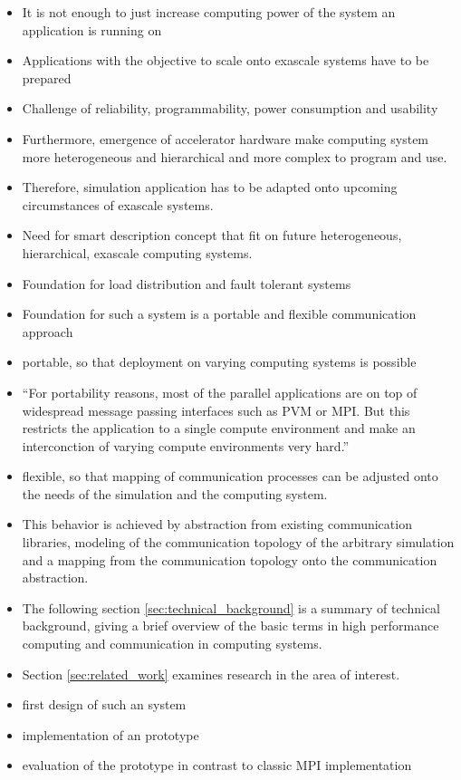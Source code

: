 \begin{itemize}
\item It is not enough to just increase computing power of the system
  an application is running on
\item Applications with the objective to scale onto exascale systems
  have to be prepared
\item Challenge of reliability, programmability, power consumption and
  usability
\item Furthermore, emergence of accelerator hardware make computing
  system more heterogeneous and hierarchical and more complex to
  program and use.
\item Therefore, simulation application has to be adapted onto
  upcoming circumstances of exascale systems.
\item Need for smart description concept that fit on future
  heterogeneous, hierarchical, exascale computing systems.
\item Foundation for load distribution and fault tolerant systems

\item Foundation for such a system is a portable and flexible
  communication approach
\item portable, so that deployment on varying computing systems is
  possible
\item ``For portability reasons, most of the parallel applications are on top
  of widespread message passing interfaces such as PVM or MPI. But
  this restricts the application to a single compute environment and
  make an interconction of varying compute environments very hard.''
\item flexible, so that mapping of communication processes can be
  adjusted onto the needs of the simulation and the computing system.
\item This behavior is achieved by abstraction from existing
  communication libraries, modeling of the communication topology of
  the arbitrary simulation and a mapping from the communication
  topology onto the communication abstraction.

\item The following section \ref{sec:technical_background} is a
  summary of technical background, giving a brief overview of the
  basic terms in high performance computing and communication in
  computing systems.
\item Section \ref{sec:related_work} examines research in the
  area of interest.
\item first design of such an system
\item implementation of an prototype
\item evaluation of the prototype in contrast to classic MPI implementation

\end{itemize}


\cleardoublepage

